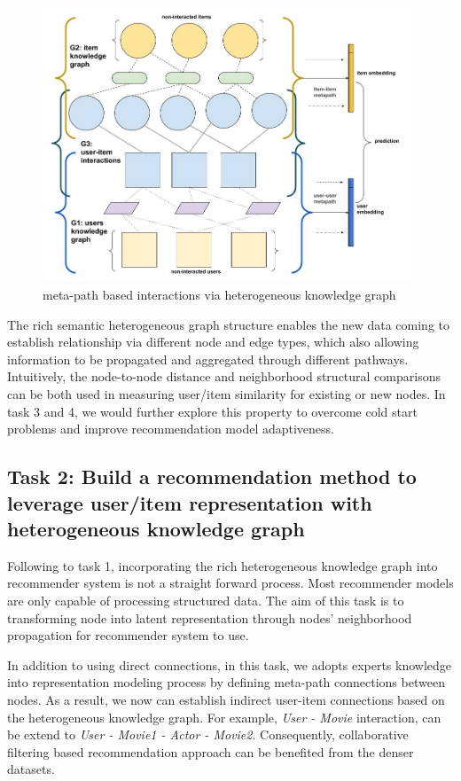\begin{figure}[!ht]
    \centering
    \includegraphics[width=0.98\textwidth]{figs/meta-embedding.jpg}
    \caption{meta-path based interactions via heterogeneous knowledge graph}\label{fig:meta_task}
\end{figure}

The rich semantic heterogeneous graph structure enables the new data coming to establish relationship via different node and edge types, which also allowing information to be propagated and aggregated through different pathways. 
Intuitively, the node-to-node distance and neighborhood structural comparisons can be both used in measuring user/item similarity for existing or new nodes. In task 3 and 4, we would further explore this property to overcome cold start problems and improve recommendation model adaptiveness.


\subsection*{Task 2: Build a recommendation method to leverage user/item representation with heterogeneous knowledge graph}

Following to task 1, incorporating the rich heterogeneous knowledge graph into recommender system is not a straight forward process. Most recommender models are only capable of processing structured data. The aim of this task is to transforming node into latent representation through nodes' neighborhood propagation for recommender system to use.

In addition to using direct connections, in this task, we adopts experts knowledge into representation modeling process by defining meta-path connections between nodes. As a result, we now can establish indirect user-item connections based on the heterogeneous knowledge graph. For example, \textit{User - Movie} interaction, can be extend to \textit{User - Movie1 - Actor - Movie2}. Consequently, collaborative filtering based recommendation approach can be benefited from the denser datasets.

